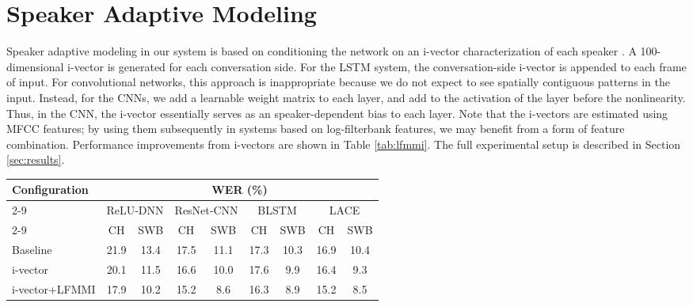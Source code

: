 \documentclass{article}
\begin{document}
\section{Speaker Adaptive Modeling}
\label{sec:sam}
Speaker adaptive modeling in our system is based on 
conditioning the network on an i-vector  \cite{dehak2011front}  
characterization of each 
speaker \cite{saon2013speaker,saonSRK16}.
A 100-dimensional i-vector is generated for each conversation side.
For the LSTM system,
the conversation-side i-vector  is appended to each frame of input.
For convolutional networks, this approach is inappropriate because
we do not expect to see spatially contiguous patterns in the input.
Instead, for the CNNs, we add a learnable weight matrix  to each 
layer, and add  to the activation of the layer before the 
nonlinearity. Thus, in the CNN, the i-vector essentially serves as an 
speaker-dependent bias to each layer. Note that the i-vectors are estimated
using MFCC features; by using them subsequently in systems based on
log-filterbank features, we may benefit from a form of feature 
combination.
Performance improvements from i-vectors are shown in Table \ref{tab:lfmmi}. 
The full experimental setup is described in Section \ref{sec:results}.
\begin{table*}[t]
    \centering
\caption{Performance improvements from i-vector and LFMMI training on the NIST 2000 CTS test set}
\vspace{0.1in}
\label{tab:lfmmi}
        \small
    \begin{tabular}{|l|c|c|c|c|c|c|c|c|}
    \hline
        \multirow{3}{*}{Configuration} & \multicolumn{8}{c|}{WER (\%)}                                  \\ \cline{2-9}
                               & \multicolumn{2}{c|}{ReLU-DNN} & \multicolumn{2}{c|}{ResNet-CNN}
				& \multicolumn{2}{c|}{BLSTM} & \multicolumn{2}{c|}{LACE}\\ \cline{2-9}
                                & CH    & SWB   & CH	& SWB	& CH    & SWB   & CH    & SWB   \\ \hline
        Baseline                & 21.9  & 13.4  & 17.5	& 11.1	& 17.3  &  10.3 & 16.9  & 10.4          \\ \hline
        i-vector                & 20.1  & 11.5  & 16.6	& 10.0	& 17.6  &  9.9  & 16.4  & 9.3     \\ \hline
        i-vector+LFMMI          & 17.9  & 10.2  & 15.2	& 8.6	& 16.3  &  8.9  & 15.2  & 8.5           \\ \hline
        \end{tabular}
\end{table*}
\end{document}
